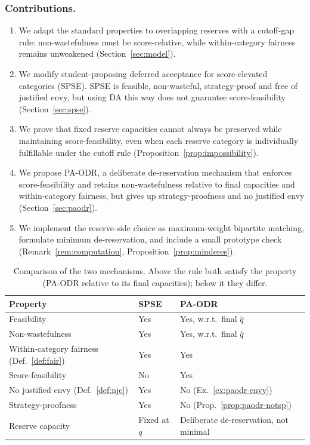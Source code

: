 \documentclass[runningheads]{llncs}
\begin{document}
\subsubsection{Contributions.}

\begin{enumerate}
\item We adapt the standard properties to overlapping reserves with a cutoff-gap rule: non-wastefulness must be score-relative, while within-category fairness remains unweakened (Section~\ref{sec:model}).
\item We modify student-proposing deferred acceptance for score-elevated categories (SPSE). SPSE is feasible, non-wasteful, strategy-proof and free of justified envy, but using DA this way does not guarantee score-feasibility (Section~\ref{sec:spse}).
\item We prove that fixed reserve capacities cannot always be preserved while maintaining score-feasibility, even when each reserve category is individually fulfillable under the cutoff rule (Proposition~\ref{prop:impossibility}).
\item We propose PA-ODR, a deliberate de-reservation mechanism that enforces score-feasibility and retains non-wastefulness relative to final capacities and within-category fairness, but gives up strategy-proofness and no justified envy (Section~\ref{sec:paodr}).
\item We implement the reserve-side choice as maximum-weight bipartite matching, formulate minimum de-reservation, and include a small prototype check (Remark~\ref{rem:computation}, Proposition~\ref{prop:minderes}).
\end{enumerate}

\begin{table}[t]
\caption{Comparison of the two mechanisms. Above the rule both satisfy the property (PA-ODR relative to its final capacities); below it they differ.}
\label{tab:comparison}
\centering
\renewcommand{\arraystretch}{1.15}
\begin{tabular}{|l|l|l|}
\hline
\textbf{Property} & \textbf{SPSE} & \textbf{PA-ODR} \\
\hline
Feasibility & Yes & Yes, w.r.t.\ final $\hat q$ \\
Non-wastefulness & Yes & Yes, w.r.t.\ final $\hat q$ \\
Within-category fairness (Def.~\ref{def:fair}) & Yes & Yes \\
\hline
Score-feasibility & No & Yes \\
No justified envy (Def.~\ref{def:nje}) & Yes & No (Ex.~\ref{ex:paodr-envy}) \\
Strategy-proofness & Yes & No (Prop.~\ref{prop:paodr-notsp}) \\
Reserve capacity & Fixed at $q$ & Deliberate de-reservation, not minimal \\
\hline
\end{tabular}
\end{table}
\end{document}
